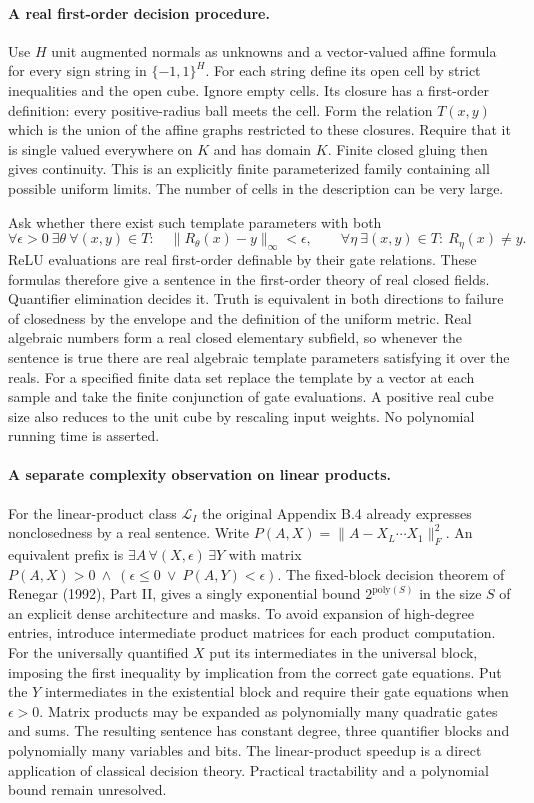 \documentclass[10pt]{article}
\begin{document}
\paragraph{A real first-order decision procedure.} Use $H$ unit augmented normals as unknowns and a vector-valued affine formula for every sign string in $\{-1,1\}^H$. For each string define its open cell by strict inequalities and the open cube. Ignore empty cells. Its closure has a first-order definition: every positive-radius ball meets the cell. Form the relation $T(x,y)$ which is the union of the affine graphs restricted to these closures. Require that it is single valued everywhere on $K$ and has domain $K$. Finite closed gluing then gives continuity. This is an explicitly finite parameterized family containing all possible uniform limits. The number of cells in the description can be very large.

Ask whether there exist such template parameters with both
\[
  \forall\epsilon>0\ \exists\theta\ \forall(x,y)\in T:\quad
       \|R_\theta(x)-y\|_\infty<\epsilon,
 \qquad
  \forall\eta\ \exists(x,y)\in T:\ R_\eta(x)\ne y .
\]
ReLU evaluations are real first-order definable by their gate relations. These formulas therefore give a sentence in the first-order theory of real closed fields. Quantifier elimination decides it. Truth is equivalent in both directions to failure of closedness by the envelope and the definition of the uniform metric. Real algebraic numbers form a real closed elementary subfield, so whenever the sentence is true there are real algebraic template parameters satisfying it over the reals. For a specified finite data set replace the template by a vector at each sample and take the finite conjunction of gate evaluations. A positive real cube size also reduces to the unit cube by rescaling input weights. No polynomial running time is asserted.

\paragraph{A separate complexity observation on linear products.} For the linear-product class $\mathcal L_I$ the original Appendix B.4 already expresses nonclosedness by a real sentence. Write $P(A,X)=\|A-X_L\cdots X_1\|_F^2$. An equivalent prefix is $\exists A\,\forall(X,\epsilon)\,\exists Y$ with matrix
$P(A,X)>0\ \wedge\ (\epsilon\le0\ \vee\ P(A,Y)<\epsilon)$.
The fixed-block decision theorem of Renegar (1992), Part II, gives a singly exponential bound $2^{\mathrm{poly}(S)}$ in the size $S$ of an explicit dense architecture and masks. To avoid expansion of high-degree entries, introduce intermediate product matrices for each product computation. For the universally quantified $X$ put its intermediates in the universal block, imposing the first inequality by implication from the correct gate equations. Put the $Y$ intermediates in the existential block and require their gate equations when $\epsilon>0$. Matrix products may be expanded as polynomially many quadratic gates and sums. The resulting sentence has constant degree, three quantifier blocks and polynomially many variables and bits. The linear-product speedup is a direct application of classical decision theory. Practical tractability and a polynomial bound remain unresolved.
\end{document}
